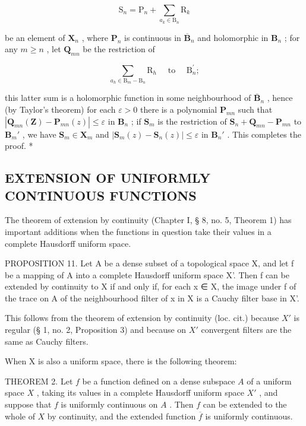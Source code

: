 \[
\mathrm{S} _ {n} = \mathrm{P} _ {n} + \sum_ {a _ {k} \in \mathrm{B} _ {n}} \mathrm{R} _ {k}
\]

be an element of \(\mathbf{X}_n\) , where \(\mathbf{P}_n\) is continuous in \(\overline{\mathbf{B}}_n\) and holomorphic in \(\mathbf{B}_n\) ; for any \(m \geqslant n\) , let \(\mathbf{Q}_{mn}\) be the restriction of

\[
\sum_ {a _ {h} \in \mathrm{B} _ {m} - \mathrm{B} _ {n}} \mathrm{R} _ {h} \quad \text { to } \quad \mathrm{B} _ {n} ^ {\prime};
\]

this latter sum is a holomorphic function in some neighbourhood of \(\bar{\mathbf{B}}_n\) , hence (by Taylor's theorem) for each \(\varepsilon > 0\) there is a polynomial \(\mathbf{P}_{mn}\) such that \(|\mathbf{Q}_{mn}(\mathbf{Z}) - \mathbf{P}_{mn}(z)| \leqslant \varepsilon\) in \(\mathbf{B}_n\) ; if \(\mathbf{S}_m\) is the restriction of \(\mathbf{S}_n + \mathbf{Q}_{mn} - \mathbf{P}_{mn}\) to \(\mathbf{B}_m'\) , we have \(\mathbf{S}_m \in \mathbf{X}_m\) and \(|\mathbf{S}_m(z) - \mathbf{S}_n(z)| \leqslant \varepsilon\) in \(\mathbf{B}_n'\) . This completes the proof. *

\subsection{EXTENSION OF UNIFORMLY CONTINUOUS FUNCTIONS}

The theorem of extension by continuity (Chapter I, § 8, no. 5, Theorem 1) has important additions when the functions in question take their values in a complete Hausdorff uniform space.

PROPOSITION 11. Let A be a dense subset of a topological space X, and let f be a mapping of A into a complete Hausdorff uniform space X'. Then f can be extended by continuity to X if and only if, for each x ∈ X, the image under f of the trace on A of the neighbourhood filter of x in X is a Cauchy filter base in X'.

This follows from the theorem of extension by continuity (loc. cit.) because \(X'\) is regular (§ 1, no. 2, Proposition 3) and because on \(X'\) convergent filters are the same as Cauchy filters.

When X is also a uniform space, there is the following theorem:

THEOREM 2. Let \(f\) be a function defined on a dense subspace \(A\) of a uniform space \(X\) , taking its values in a complete Hausdorff uniform space \(X'\) , and suppose that \(f\) is uniformly continuous on \(A\) . Then \(f\) can be extended to the whole of \(X\) by continuity, and the extended function \(\overline{f}\) is uniformly continuous.

